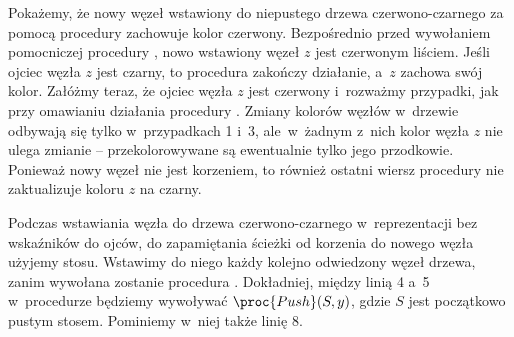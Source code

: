 \exercise %
Pokażemy, że nowy węzeł wstawiony do niepustego drzewa czerwono-czarnego za pomocą procedury  zachowuje kolor czerwony.
Bezpośrednio przed wywołaniem pomocniczej procedury , nowo wstawiony węzeł $z$ jest czerwonym liściem.
Jeśli ojciec węzła $z$ jest czarny, to procedura zakończy działanie, a~$z$ zachowa swój kolor.
Załóżmy teraz, że ojciec węzła $z$ jest czerwony i~rozważmy przypadki, jak przy omawianiu działania procedury .
Zmiany kolorów węzłów w~drzewie odbywają się tylko w~przypadkach 1 i~3, ale~w~żadnym z~nich kolor węzła $z$ nie ulega zmianie -- przekolorowywane są ewentualnie tylko jego przodkowie.
Ponieważ nowy węzeł nie jest korzeniem, to również ostatni wiersz procedury  nie zaktualizuje koloru $z$ na czarny.

\exercise %
Podczas wstawiania węzła do drzewa czerwono-czarnego w~reprezentacji bez wskaźników do ojców, do zapamiętania ścieżki od korzenia do nowego węzła użyjemy stosu.
Wstawimy do niego każdy kolejno odwiedzony węzeł drzewa, zanim wywołana zostanie procedura .
Dokładniej, między linią 4 a~5 w~procedurze  będziemy wywoływać $\proc{Push}(S,y)$, gdzie $S$ jest początkowo pustym stosem.
Pominiemy w~niej także linię 8.


